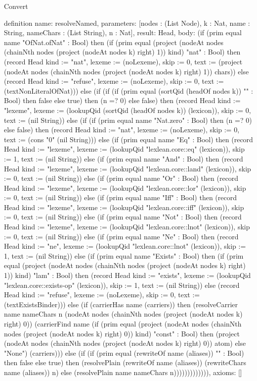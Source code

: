 \begin{lexlean}{Convert}
\begin{semanticmodule}
definition{
  name: resolveNamed,
  parameters: [nodes : (List Node), k : Nat, name : String, nameChars : (List String), n : Nat],
  result: Head,
  body: (if (prim equal name "OfNat.ofNat" : Bool) then (if (prim equal (project (nodeAt nodes (chainNth nodes (project (nodeAt nodes k) right) 1)) kind) "nat" : Bool) then (record Head {kind := "nat", lexeme := (noLexeme), skip := 0, text := (project (nodeAt nodes (chainNth nodes (project (nodeAt nodes k) right) 1)) chars)}) else (record Head {kind := "refuse", lexeme := (noLexeme), skip := 0, text := (textNonLiteralOfNat)})) else (if (if (if (prim equal (sortQid (headOf nodes k)) "" : Bool) then false else true) then (n =? 0) else false) then (record Head {kind := "lexeme", lexeme := (lookupQid (sortQid (headOf nodes k)) (lexicon)), skip := 0, text := (nil String)}) else (if (if (prim equal name "Nat.zero" : Bool) then (n =? 0) else false) then (record Head {kind := "nat", lexeme := (noLexeme), skip := 0, text := (cons "0" (nil String))}) else (if (prim equal name "Eq" : Bool) then (record Head {kind := "lexeme", lexeme := (lookupQid "lexlean.core::eq" (lexicon)), skip := 1, text := (nil String)}) else (if (prim equal name "And" : Bool) then (record Head {kind := "lexeme", lexeme := (lookupQid "lexlean.core::land" (lexicon)), skip := 0, text := (nil String)}) else (if (prim equal name "Or" : Bool) then (record Head {kind := "lexeme", lexeme := (lookupQid "lexlean.core::lor" (lexicon)), skip := 0, text := (nil String)}) else (if (prim equal name "Iff" : Bool) then (record Head {kind := "lexeme", lexeme := (lookupQid "lexlean.core::iff" (lexicon)), skip := 0, text := (nil String)}) else (if (prim equal name "Not" : Bool) then (record Head {kind := "lexeme", lexeme := (lookupQid "lexlean.core::lnot" (lexicon)), skip := 0, text := (nil String)}) else (if (prim equal name "Ne" : Bool) then (record Head {kind := "ne", lexeme := (lookupQid "lexlean.core::lnot" (lexicon)), skip := 1, text := (nil String)}) else (if (prim equal name "Exists" : Bool) then (if (prim equal (project (nodeAt nodes (chainNth nodes (project (nodeAt nodes k) right) 1)) kind) "lam" : Bool) then (record Head {kind := "exists", lexeme := (lookupQid "lexlean.core::exists-op" (lexicon)), skip := 1, text := (nil String)}) else (record Head {kind := "refuse", lexeme := (noLexeme), skip := 0, text := (textExistsBinder)})) else (if (carrierHas name (carriers)) then (resolveCarrier name nameChars n (nodeAt nodes (chainNth nodes (project (nodeAt nodes k) right) 0)) (carrierFind name (if (prim equal (project (nodeAt nodes (chainNth nodes (project (nodeAt nodes k) right) 0)) kind) "const" : Bool) then (project (nodeAt nodes (chainNth nodes (project (nodeAt nodes k) right) 0)) atom) else "None") (carriers))) else (if (if (prim equal (rewriteOf name (aliases)) "" : Bool) then false else true) then (resolvePlain (rewriteOf name (aliases)) (rewriteChars name (aliases)) n) else (resolvePlain name nameChars n))))))))))))),
  axioms: []
}


\end{semanticmodule}
\end{lexlean}
